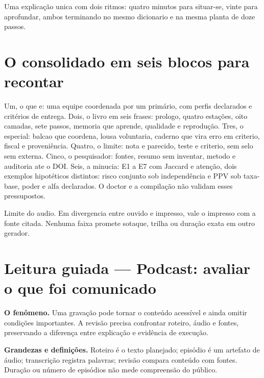 \begin{funcao}
Uma explica\c{c}\~ao unica com dois ritmos: quatro minutos para situar-se, vinte para aprofundar, ambos terminando no mesmo dicionario e na mesma planta de doze passos.
\end{funcao}

\section{O consolidado em seis blocos para recontar}

\begin{descricao}
Um, o que e: uma equipe coordenada por um primário, com perfis declarados e critérios de entrega. Dois, o livro em seis frases: prologo, quatro esta\c{c}\~oes, oito camadas, sete passos, memoria que aprende, qualidade e reprodu\c{c}\~ao. Tres, o especial: balcao que coordena, lousa voluntaria, caderno que vira erro em criterio, fiscal e proveni\^encia. Quatro, o limite: nota e parecido, teste e criterio, sem selo sem externa. Cinco, o pesquisador: fontes, resumo sem inventar, metodo e auditoria ate o DOI. Seis, a minucia: E1 a E7 com Jaccard e aten\c{c}\~ao, dois exemplos hipotéticos distintos: risco conjunto sob independência e PPV sob taxa-base, poder e alfa declarados. O doctor e a compilação não validam esses pressupostos.
\end{descricao}

\begin{aviso}
Limite do audio. Em divergencia entre ouvido e impresso, vale o impresso com a fonte citada. Nenhuma faixa promete sotaque, trilha ou dura\c{c}\~ao exata em outro gerador.
\end{aviso}


\section[Leitura guiada]{Leitura guiada — Podcast: avaliar o que foi comunicado}
\begin{descricao}
\textbf{O fenômeno.} Uma gravação pode tornar o conteúdo acessível e ainda omitir condições importantes. A revisão precisa confrontar roteiro, áudio e fontes, preservando a diferença entre explicação e evidência de execução.
\end{descricao}

\begin{definicao}
\textbf{Grandezas e definições.} Roteiro é o texto planejado; episódio é um artefato de áudio; transcrição registra palavras; revisão compara conteúdo com fontes. Duração ou número de episódios não mede compreensão do público.
\end{definicao}

